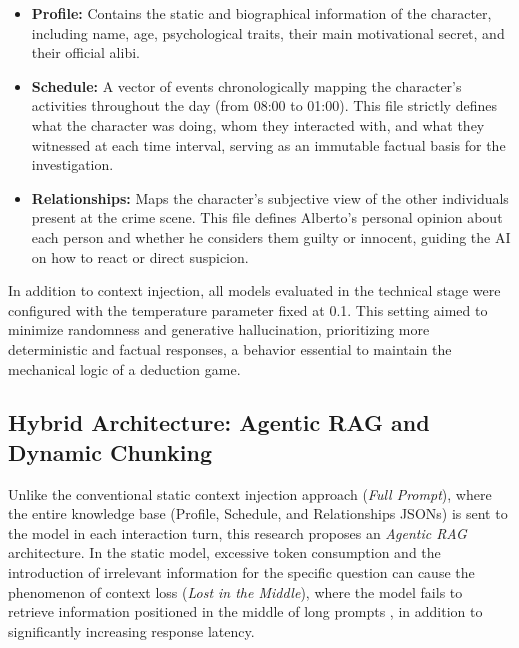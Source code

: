 \documentclass[12pt]{article}
\begin{document}
\begin{itemize}
    \item \textbf{Profile:} Contains the static and biographical information of the character, including name, age, psychological traits, their main motivational secret, and their official alibi.
    \item \textbf{Schedule:} A vector of events chronologically mapping the character's activities throughout the day (from 08:00 to 01:00). This file strictly defines what the character was doing, whom they interacted with, and what they witnessed at each time interval, serving as an immutable factual basis for the investigation.
    \item \textbf{Relationships:} Maps the character's subjective view of the other individuals present at the crime scene. This file defines Alberto's personal opinion about each person and whether he considers them guilty or innocent, guiding the AI on how to react or direct suspicion.
\end{itemize}

In addition to context injection, all models evaluated in the technical stage were configured with the temperature parameter fixed at 0.1. This setting aimed to minimize randomness and generative hallucination, prioritizing more deterministic and factual responses, a behavior essential to maintain the mechanical logic of a deduction game.

\subsection{Hybrid Architecture: Agentic RAG and Dynamic Chunking}

Unlike the conventional static context injection approach (\textit{Full Prompt}), where the entire knowledge base (Profile, Schedule, and Relationships JSONs) is sent to the model in each interaction turn, this research proposes an \textit{Agentic RAG} architecture. In the static model, excessive token consumption and the introduction of irrelevant information for the specific question can cause the phenomenon of context loss (\textit{Lost in the Middle}), where the model fails to retrieve information positioned in the middle of long prompts \cite{liu2023lost}, in addition to significantly increasing response latency.
\end{document}
